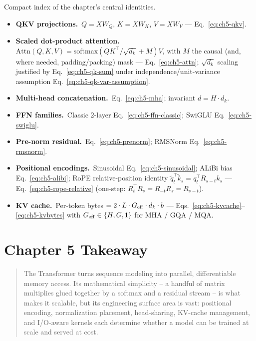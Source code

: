 \begin{derivledger}
Compact index of the chapter's central identities.
\begin{itemize}
  \item \textbf{QKV projections.}\
        $Q = X W_Q$, $K = X W_K$, $V = X W_V$
        --- Eq.~\eqref{eq:ch5-qkv}.
  \item \textbf{Scaled dot-product attention.}\
        $\mathrm{Attn}(Q,K,V) = \mathrm{softmax}(QK^\top/\sqrt{d_k} + M)V$,
        with $M$ the causal (and, where needed, padding/packing)
        mask --- Eq.~\eqref{eq:ch5-attn};
        $\sqrt{d_k}$ scaling justified by Eq.~\eqref{eq:ch5-qk-sum}
        under independence/unit-variance assumption
        Eq.~\eqref{eq:ch5-qk-var-assumption}.
  \item \textbf{Multi-head concatenation.}\
        Eq.~\eqref{eq:ch5-mha}; invariant $d = H \cdot d_k$.
  \item \textbf{FFN families.}\
        Classic 2-layer Eq.~\eqref{eq:ch5-ffn-classic};
        SwiGLU Eq.~\eqref{eq:ch5-swiglu}.
  \item \textbf{Pre-norm residual.}\
        Eq.~\eqref{eq:ch5-prenorm}; RMSNorm
        Eq.~\eqref{eq:ch5-rmsnorm}.
  \item \textbf{Positional encodings.}\
        Sinusoidal Eq.~\eqref{eq:ch5-sinusoidal};
        ALiBi bias Eq.~\eqref{eq:ch5-alibi};
        RoPE relative-position identity
        $\tilde q_t^\top \tilde k_s = q_t^\top R_{s-t} k_s$
        --- Eq.~\eqref{eq:ch5-rope-relative} (one-step:
        $R_t^\top R_s = R_{-t} R_s = R_{s-t}$).
  \item \textbf{KV cache.}\
        Per-token bytes $= 2 \cdot L \cdot G_{\rm eff} \cdot d_k \cdot b$
        --- Eqs.~\eqref{eq:ch5-kvcache}--\eqref{eq:ch5-kvbytes}
        with $G_{\rm eff} \in \{H, G, 1\}$ for MHA / GQA / MQA.
\end{itemize}
\end{derivledger}

\section{Chapter 5 Takeaway}

\begin{quote}
The Transformer turns sequence modeling into parallel, differentiable
memory access. Its mathematical simplicity -- a handful of matrix
multiplies glued together by a softmax and a residual stream -- is
what makes it scalable, but its engineering surface area is vast:
positional encoding, normalization placement, head-sharing, KV-cache
management, and I/O-aware kernels each determine whether a model can
be trained at scale and served at cost.
\end{quote}
